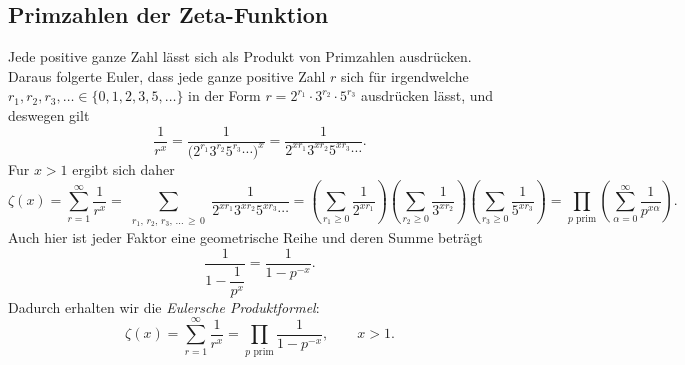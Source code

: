 \subsection{Primzahlen der Zeta-Funktion}
\label{basel:subsection:zetaprimzahlen}

Jede positive ganze Zahl lässt sich als Produkt von Primzahlen ausdrücken.
Daraus folgerte Euler, dass jede ganze positive Zahl $r$ sich für irgendwelche
$r_1, r_2, r_3, \ldots \in \{0, 1, 2, 3, 5, \ldots\}$ in der Form
$r = 2^{r_1} \cdot 3^{r_2} \cdot 5^{r_3}$ ausdrücken lässt, und deswegen gilt
\[
    \frac{1}{r^x}
    =
    \frac{1}{\bigl(2^{r_1} 3^{r_2} 5^{r_3} \cdots\bigr)^x}
    =
    \frac{1}{2^{x r_1} 3^{x r_2} 5^{x r_3} \cdots}.
\]
Fur $x > 1$ ergibt sich daher
\[
    \zeta(x)
    =
    \sum_{r=1}^{\infty} \frac{1}{r^x}
    =
    \sum_{\substack{r_1,\, r_2,\, r_3,\, \ldots\, \geq\, 0}}
        \frac{1}{2^{x r_1} 3^{x r_2} 5^{x r_3} \cdots}
    =
    \left(\sum_{r_1 \geq 0} \frac{1}{2^{x r_1}}\right)
    \left(\sum_{r_2 \geq 0} \frac{1}{3^{x r_2}}\right)
    \left(\sum_{r_3 \geq 0} \frac{1}{5^{x r_3}}\right)
    =
    \prod_{p \text{ prim}}
    \left(\sum_{\alpha=0}^{\infty} \frac{1}{p^{x\alpha}}\right).
\]
Auch hier ist jeder Faktor eine geometrische Reihe und deren Summe beträgt
\[
    \frac{1}{1 - \dfrac{1}{p^x}}
    =
    \frac{1}{1 - p^{-x}}.
\]
Dadurch erhalten wir die \emph{Eulersche Produktformel}:
\begin{equation}
    \zeta(x)
    =
    \sum_{r=1}^{\infty} \frac{1}{r^x}
    =
    \prod_{p \text{ prim}} \frac{1}{1 - p^{-x}},
    \qquad x > 1.
    \label{basel:equation:eulerprod}
\end{equation}
